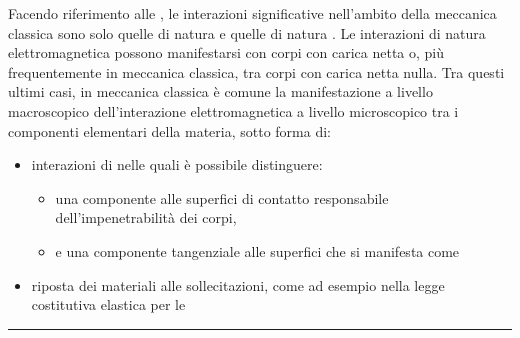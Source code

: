 \documentclass[letterpaper,10pt,italian]{jupyterBook}
\begin{document}
\sphinxAtStartPar
{} Facendo riferimento alle {\hyperref[\detokenize{ch/intro/current-status:physics-hs-intro-current-status-fundamental-interactions}]{}}, le interazioni significative nell’ambito della meccanica classica sono solo quelle di natura {\hyperref[\detokenize{ch/mechanics/actions-examples:physics-hs-mechanics-actions-gravitation}]{}} e quelle di natura . Le interazioni di natura elettromagnetica possono manifestarsi con corpi con carica netta o, più frequentemente in meccanica classica, tra corpi con carica netta nulla. Tra questi ultimi casi, in meccanica classica è comune la manifestazione a livello macroscopico dell’interazione elettromagnetica a livello microscopico tra i componenti elementari della materia, sotto forma di:
\begin{itemize}
\item {} 
\sphinxAtStartPar
interazioni di {\hyperref[\detokenize{ch/mechanics/actions-examples:physics-hs-mechanics-actions-contact}]{}} nelle quali è possibile distinguere:
\begin{itemize}
\item {} 
\sphinxAtStartPar
una componente  alle superfici di contatto responsabile dell’impenetrabilità dei corpi,

\item {} 
\sphinxAtStartPar
e una componente tangenziale alle superfici che si manifesta come {\hyperref[\detokenize{ch/mechanics/actions-examples:physics-hs-mechanics-actions-contact-friction-dynamic}]{}}

\end{itemize}

\item {} 
\sphinxAtStartPar
riposta dei materiali alle sollecitazioni, come ad esempio nella legge costitutiva elastica per le {\hyperref[\detokenize{ch/mechanics/actions-examples:physics-hs-mechanics-actions-spring}]{}}

\end{itemize}






\bigskip\hrule\bigskip
\end{document}
